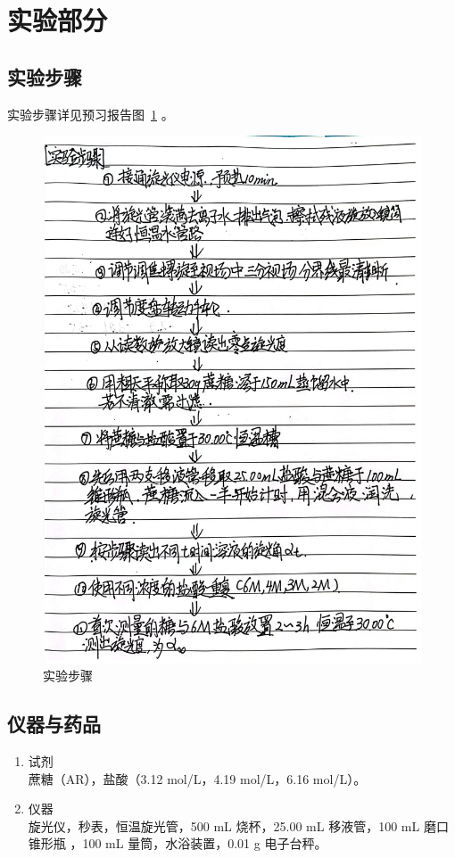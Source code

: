 \documentclass[cn,hazy,pku,12pt,normal,math=newtx,cite=super]{elegantnote}
\begin{document}
\section{实验部分}

\subsection{实验步骤}

实验步骤详见预习报告图~\ref{4} 。

\begin{figure}[htbp]
    \centering
    \includegraphics[width = .70\textwidth]{image/yxbg_3.jpg}
    \caption{实验步骤}\label{4}
\end{figure}

\subsection{仪器与药品}

\begin{enumerate} %
    \item 试剂 \\ 蔗糖（AR），盐酸（3.12 mol/L，4.19 mol/L，6.16 mol/L）。
    
    \item 仪器 \\ 旋光仪，秒表，恒温旋光管，500 mL 烧杯，25.00 mL 移液管，100 mL 磨口锥形瓶
    ，100 mL 量筒，水浴装置，0.01 g 电子台秤。
\end{enumerate}
\end{document}
